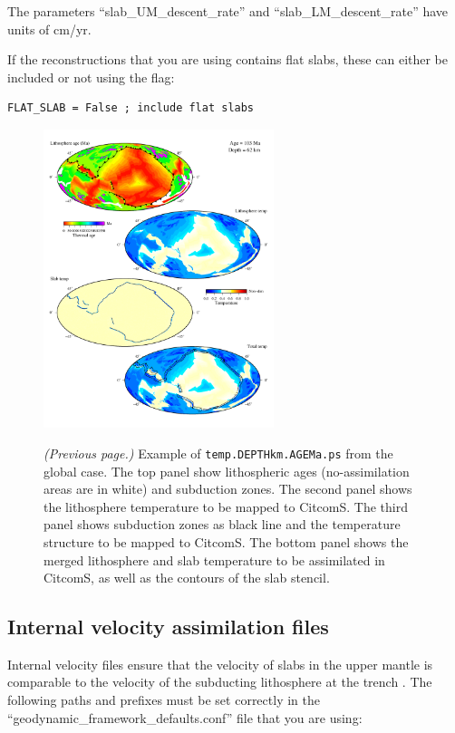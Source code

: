 \documentclass[letterpaper,12pt]{article}
\begin{document}
The parameters ``slab\_UM\_descent\_rate'' and ``slab\_LM\_descent\_rate'' have units of cm/yr. 

If the reconstructions that you are using contains flat slabs, these can either be included or not using the flag:

\begin{verbatim}
FLAT_SLAB = False ; include flat slabs
\end{verbatim}

\begin{figure}[htb]
\centering
\includegraphics[width=0.6\textwidth]{figs/temp_62km_103Ma}
\end{figure}

\begin{figure}[htb]
\caption{\textit{(Previous page.)} Example of \texttt{temp.DEPTHkm.AGEMa.ps} from the global case. The top panel show lithospheric ages (no-assimilation areas are in white) and subduction zones. The second panel shows the lithosphere temperature to be mapped to CitcomS. The third panel shows subduction zones as black line and the temperature structure to be mapped to CitcomS. The bottom panel shows the merged lithosphere and slab temperature to be assimilated in CitcomS, as well as the contours of the slab stencil.}
\label{fig:stencileg}
\end{figure}

\subsection{Internal velocity assimilation files}
Internal velocity files ensure that the velocity of slabs in the upper mantle is comparable to the velocity of the subducting lithosphere at the trench \citep[see][]{BGF15}.  The following paths and prefixes must be set correctly in the ``geodynamic\_framework\_defaults.conf'' file that you are using:
\end{document}

